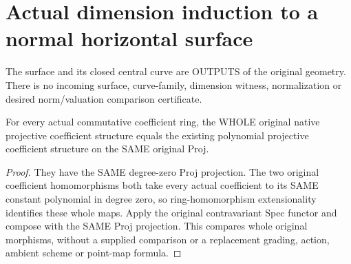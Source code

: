 \section{Actual dimension induction to a normal horizontal surface}
The surface and its closed central curve are OUTPUTS of the original
geometry. There is no incoming surface, curve-family, dimension witness,
normalization or desired norm/valuation comparison certificate.

\begin{lemma}
\label{lem:pl-gauss-original-native-polynomial-structure-whole-equality}
\leanok
For every actual commutative coefficient ring, the WHOLE original
native projective coefficient structure equals the existing polynomial
projective coefficient structure on the SAME original Proj.
\end{lemma}
\begin{proof}
They have the SAME degree-zero Proj projection. The two original
coefficient homomorphisms both take every actual coefficient to its
SAME constant polynomial in degree zero, so ring-homomorphism
extensionality identifies these whole maps. Apply the original
contravariant Spec functor and compose with the SAME Proj projection.
This compares whole original morphisms, without a supplied comparison
or a replacement grading, action, ambient scheme or point-map formula.
\end{proof}

